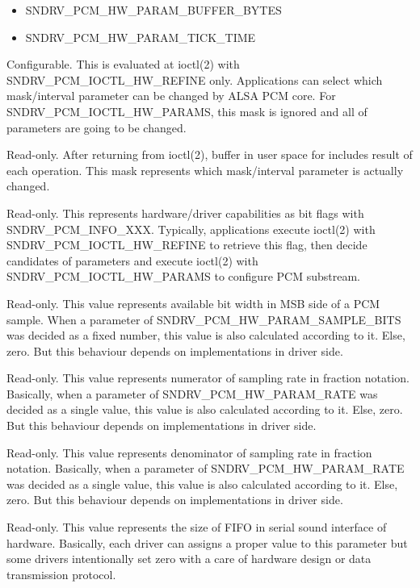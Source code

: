 \documentclass[a4paper,8pt,english]{sphinxmanual}
\begin{document}
\begin{description}
\begin{itemize}
\item {} 
SNDRV\_PCM\_HW\_PARAM\_BUFFER\_BYTES

\item {} 
SNDRV\_PCM\_HW\_PARAM\_TICK\_TIME

\end{itemize}

\item[{\code{rmask}}] \leavevmode
Configurable. This is evaluated at ioctl(2) with
SNDRV\_PCM\_IOCTL\_HW\_REFINE only. Applications can select which
mask/interval parameter can be changed by ALSA PCM core. For
SNDRV\_PCM\_IOCTL\_HW\_PARAMS, this mask is ignored and all of parameters
are going to be changed.

\item[{\code{cmask}}] \leavevmode
Read-only. After returning from ioctl(2), buffer in user space for
 includes result of each operation.
This mask represents which mask/interval parameter is actually changed.

\item[{\code{info}}] \leavevmode
Read-only. This represents hardware/driver capabilities as bit flags
with SNDRV\_PCM\_INFO\_XXX. Typically, applications execute ioctl(2) with
SNDRV\_PCM\_IOCTL\_HW\_REFINE to retrieve this flag, then decide candidates
of parameters and execute ioctl(2) with SNDRV\_PCM\_IOCTL\_HW\_PARAMS to
configure PCM substream.

\item[{\code{msbits}}] \leavevmode
Read-only. This value represents available bit width in MSB side of
a PCM sample. When a parameter of SNDRV\_PCM\_HW\_PARAM\_SAMPLE\_BITS was
decided as a fixed number, this value is also calculated according to
it. Else, zero. But this behaviour depends on implementations in driver
side.

\item[{\code{rate\_num}}] \leavevmode
Read-only. This value represents numerator of sampling rate in fraction
notation. Basically, when a parameter of SNDRV\_PCM\_HW\_PARAM\_RATE was
decided as a single value, this value is also calculated according to
it. Else, zero. But this behaviour depends on implementations in driver
side.

\item[{\code{rate\_den}}] \leavevmode
Read-only. This value represents denominator of sampling rate in
fraction notation. Basically, when a parameter of
SNDRV\_PCM\_HW\_PARAM\_RATE was decided as a single value, this value is
also calculated according to it. Else, zero. But this behaviour depends
on implementations in driver side.

\item[{\code{fifo\_size}}] \leavevmode
Read-only. This value represents the size of FIFO in serial sound
interface of hardware. Basically, each driver can assigns a proper
value to this parameter but some drivers intentionally set zero with
a care of hardware design or data transmission protocol.

\end{description}
\end{document}
